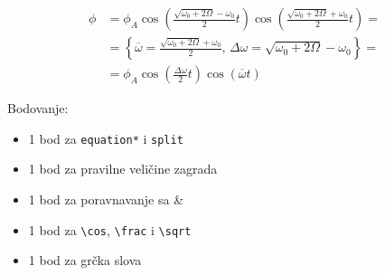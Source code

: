 \documentclass[12pt]{scrartcl}
\begin{document}
\begin{equation*}
    \begin{split}
        \phi &= \phi_A\cos\left(\frac{\sqrt{\omega_0+2\Omega}-\omega_0}{2}t\right)\cos\left(\frac{\sqrt{\omega_0+2\Omega}+\omega_0}{2}t\right)= \\
        &= \left\{ \overline{\omega}= \frac{\sqrt{\omega_0+2\Omega}+\omega_0}{2} \text{, } \Delta \omega =  \sqrt{\omega_0+2\Omega}-\omega_0 \right\}= \\
        &= \phi_A\cos\left(\frac{\Delta \omega}{2}t\right)\cos(\overline{\omega}t)
    \end{split}
\end{equation*}

Bodovanje:
\begin{itemize}
    \item 1 bod za \verb!equation*! i \verb!split!
    \item 1 bod za pravilne veličine zagrada
    \item 1 bod za poravnavanje sa \&
    \item 1 bod za \verb!\cos!, \verb!\frac! i \verb!\sqrt!
    \item 1 bod za grčka slova
\end{itemize}
\end{document}
